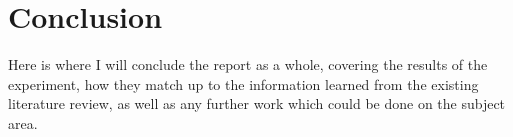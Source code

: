 \chapter{Conclusion}
\label{conclusion}

Here is where I will conclude the report as a whole, covering the results of the experiment, how they match up to the information learned from the existing literature review, as well as any further work which could be done on the subject area.
